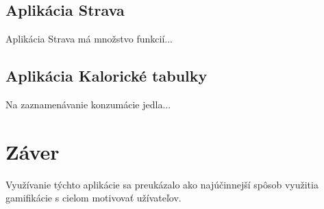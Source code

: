 \documentclass[10pt,twoside,slovak,a4paper]{article}
\begin{document}
\subsection{Aplikácia Strava}
Aplikácia Strava má množstvo funkcií...

\subsection{Aplikácia Kalorické tabulky}
Na zaznamenávanie konzumácie jedla...






\section{Záver} \label{zaver} 
Využívanie týchto aplikácie sa preukázalo ako najúčinnejší spôsob využitia gamifikácie s cielom motivovať užívateľov.



\nocite{Bunturo:EGHFMA}
\nocite{Wijaya:DGCycling}


\end{document}
